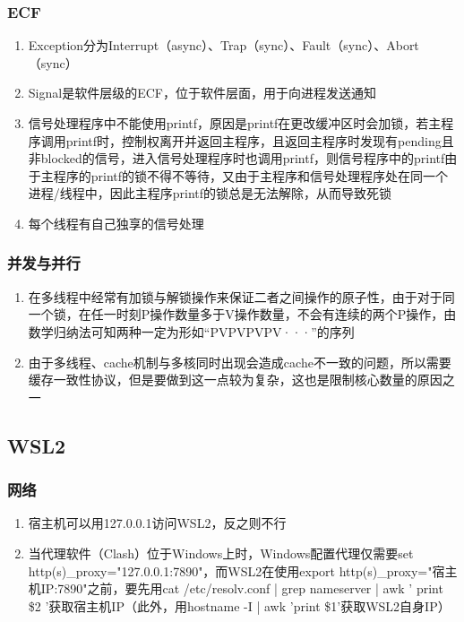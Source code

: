 \documentclass[onecolumn]{article}
\begin{document}
        \subsubsection{ECF}
            \noindent
            \begin{enumerate}
                \item Exception分为Interrupt（async）、Trap（sync）、Fault（sync）、Abort（sync）
                \item Signal是软件层级的ECF，位于软件层面，用于向进程发送通知
                \item 信号处理程序中不能使用printf，原因是printf在更改缓冲区时会加锁，若主程序调用printf时，控制权离开并返回主程序，且返回主程序时发现有pending且非blocked的信号，进入信号处理程序时也调用printf，则信号程序中的printf由于主程序的printf的锁不得不等待，又由于主程序和信号处理程序处在同一个进程/线程中，因此主程序printf的锁总是无法解除，从而导致死锁
                \item 每个线程有自己独享的信号处理
            \end{enumerate}
        \subsubsection{并发与并行}
            \noindent
            \begin{enumerate}
                \item 在多线程中经常有加锁与解锁操作来保证二者之间操作的原子性，由于对于同一个锁，在任一时刻P操作数量多于V操作数量，不会有连续的两个P操作，由数学归纳法可知两种一定为形如“PVPVPVPV···”的序列
                \item 由于多线程、cache机制与多核同时出现会造成cache不一致的问题，所以需要缓存一致性协议，但是要做到这一点较为复杂，这也是限制核心数量的原因之一
            \end{enumerate}
    \subsection{WSL2}
        \subsubsection{网络}
            \noindent
            \begin{enumerate}
                \item 宿主机可以用127.0.0.1访问WSL2，反之则不行
                \item 当代理软件（Clash）位于Windows上时，Windows配置代理仅需要set http(s)\_proxy="127.0.0.1:7890"，而WSL2在使用export http(s)\_proxy="宿主机IP:7890"之前，要先用cat /etc/resolv.conf | grep nameserver | awk '{ print \$2 }'获取宿主机IP（此外，用hostname -I | awk '{print \$1}'获取WSL2自身IP）
            \end{enumerate}
\end{document}
